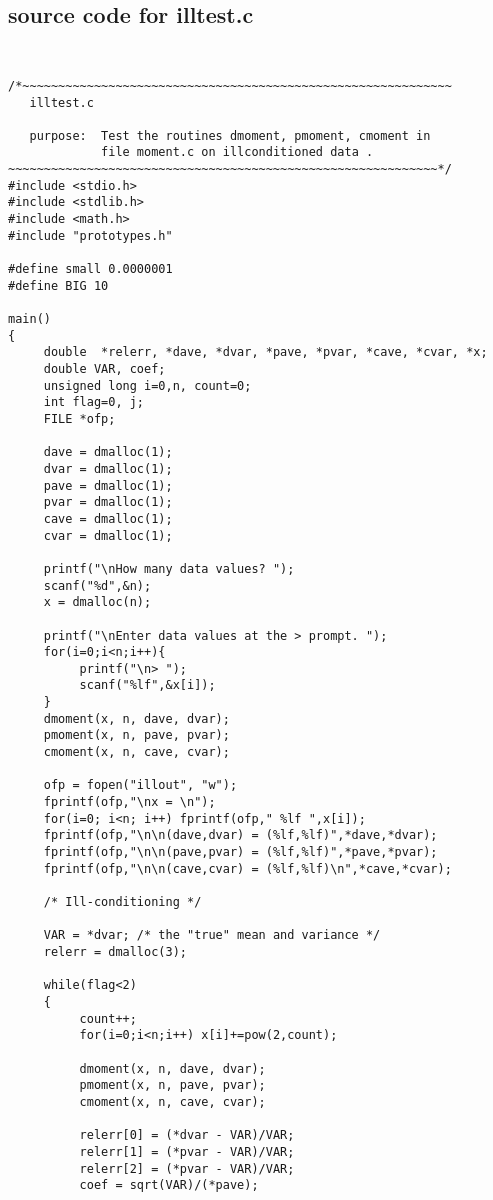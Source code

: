 \documentclass{article}
\begin{document}
\subsection{source code for illtest.c}
{\tt
\begin{verbatim}
/*~~~~~~~~~~~~~~~~~~~~~~~~~~~~~~~~~~~~~~~~~~~~~~~~~~~~~~~~~~~~
   illtest.c

   purpose:  Test the routines dmoment, pmoment, cmoment in 
             file moment.c on illconditioned data .
~~~~~~~~~~~~~~~~~~~~~~~~~~~~~~~~~~~~~~~~~~~~~~~~~~~~~~~~~~~~*/
#include <stdio.h>
#include <stdlib.h>
#include <math.h>
#include "prototypes.h"

#define small 0.0000001
#define BIG 10

main()
{
     double  *relerr, *dave, *dvar, *pave, *pvar, *cave, *cvar, *x;
     double VAR, coef;
     unsigned long i=0,n, count=0;
     int flag=0, j;
     FILE *ofp;       
  
     dave = dmalloc(1);
     dvar = dmalloc(1);
     pave = dmalloc(1);
     pvar = dmalloc(1);
     cave = dmalloc(1);
     cvar = dmalloc(1);
  
     printf("\nHow many data values? ");
     scanf("%d",&n);
     x = dmalloc(n);

     printf("\nEnter data values at the > prompt. ");
     for(i=0;i<n;i++){
          printf("\n> ");
          scanf("%lf",&x[i]);
     }
     dmoment(x, n, dave, dvar);
     pmoment(x, n, pave, pvar);
     cmoment(x, n, cave, cvar);

     ofp = fopen("illout", "w");
     fprintf(ofp,"\nx = \n");
     for(i=0; i<n; i++) fprintf(ofp," %lf ",x[i]);
     fprintf(ofp,"\n\n(dave,dvar) = (%lf,%lf)",*dave,*dvar);
     fprintf(ofp,"\n\n(pave,pvar) = (%lf,%lf)",*pave,*pvar);
     fprintf(ofp,"\n\n(cave,cvar) = (%lf,%lf)\n",*cave,*cvar);

     /* Ill-conditioning */

     VAR = *dvar; /* the "true" mean and variance */
     relerr = dmalloc(3);

     while(flag<2) 
     {
          count++;          
          for(i=0;i<n;i++) x[i]+=pow(2,count); 

          dmoment(x, n, dave, dvar);
          pmoment(x, n, pave, pvar);
          cmoment(x, n, cave, cvar);

          relerr[0] = (*dvar - VAR)/VAR;
          relerr[1] = (*pvar - VAR)/VAR;
          relerr[2] = (*pvar - VAR)/VAR;
          coef = sqrt(VAR)/(*pave);
                        

\end{verbatim}}
\end{document}
